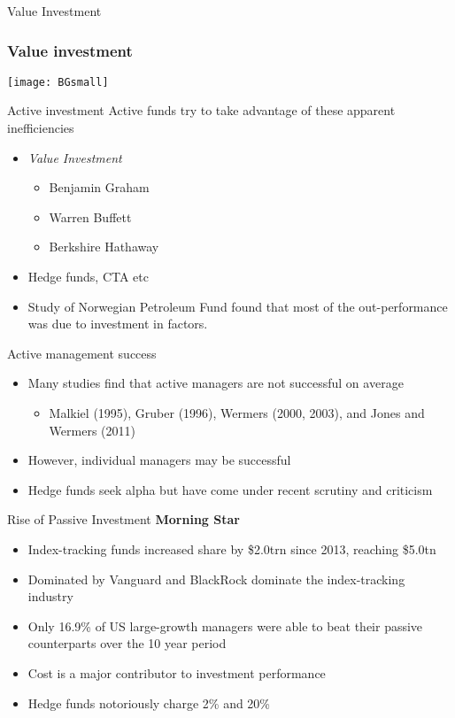 \documentclass[14pt,xcolor=pdftex,dvipsnames,table]{beamer}\usepackage[]{graphicx}\usepackage[]{color}
\begin{document}
\begin{frame}{Value Investment}
\frametitle{Value investment}
\begin{center}
\texttt{[image: BGsmall]}
\end{center}
\end{frame}

\begin{frame}{Active investment}
Active funds try to take advantage of these apparent inefficiencies
\begin{itemize}[<+-| alert@+>]
\pause
\item \emph{Value Investment}
\begin{itemize}
\item Benjamin Graham
\item Warren Buffett
\item Berkshire Hathaway
\end{itemize}
\item Hedge funds, CTA etc
\item Study of Norwegian Petroleum Fund found that most of the out-performance was due to investment in factors.  
\end{itemize}
\end{frame}

\begin{frame}{Active management success}
\begin{itemize}[<+-| alert@+>]
\pause
\item Many studies find that active managers are not successful on average
\begin{itemize}
\item Malkiel (1995), Gruber (1996), Wermers (2000, 2003), and Jones
and Wermers (2011)
\end{itemize}
\item However, individual managers may be successful
\item Hedge funds seek alpha but have come under recent scrutiny and criticism
\end{itemize}
\end{frame}
 
\begin{frame}{Rise of Passive Investment}
\textbf{Morning Star}
\begin{itemize}[<+-| alert@+>]
\pause
\item Index-tracking funds increased share by \$2.0trn since 2013, reaching \$5.0tn
\item Dominated by Vanguard and BlackRock dominate the index-tracking industry
\item Only 16.9\% of US large-growth managers were able to beat their passive counterparts over the 10 year period
\item Cost is a major contributor to investment performance
\item Hedge funds notoriously charge 2\% and 20\%
\end{itemize}
\end{frame}
\end{document}
